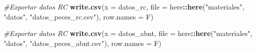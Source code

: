 \documentclass[]{krantz}
\newenvironment{Shaded}{\begin{snugshade}}{\end{snugshade}}
\newcommand{\CommentTok}[1]{\textcolor[rgb]{0.56,0.35,0.01}{\textit{#1}}}
\newcommand{\DataTypeTok}[1]{\textcolor[rgb]{0.13,0.29,0.53}{#1}}
\newcommand{\KeywordTok}[1]{\textcolor[rgb]{0.13,0.29,0.53}{\textbf{#1}}}
\newcommand{\NormalTok}[1]{#1}
\newcommand{\OperatorTok}[1]{\textcolor[rgb]{0.81,0.36,0.00}{\textbf{#1}}}
\newcommand{\StringTok}[1]{\textcolor[rgb]{0.31,0.60,0.02}{#1}}
\begin{document}
\begin{Shaded}
\end{Shaded}

\begin{Shaded}
\begin{Highlighting}[]
\CommentTok{#Exportar datos RC}
\KeywordTok{write.csv}\NormalTok{(}\DataTypeTok{x =}\NormalTok{ datos_rc,}
          \DataTypeTok{file =}\NormalTok{ here}\OperatorTok{::}\KeywordTok{here}\NormalTok{(}\StringTok{"materiales"}\NormalTok{, }\StringTok{"datos"}\NormalTok{, }\StringTok{"datos_peces_rc.csv"}\NormalTok{),}
          \DataTypeTok{row.names =}\NormalTok{ F)}
\end{Highlighting}
\end{Shaded}

\begin{Shaded}
\begin{Highlighting}[]
\CommentTok{#Exportar datos RC}
\KeywordTok{write.csv}\NormalTok{(}\DataTypeTok{x =}\NormalTok{ datos_abnt,}
          \DataTypeTok{file =}\NormalTok{ here}\OperatorTok{::}\KeywordTok{here}\NormalTok{(}\StringTok{"materiales"}\NormalTok{, }\StringTok{"datos"}\NormalTok{, }\StringTok{"datos_peces_abnt.csv"}\NormalTok{),}
          \DataTypeTok{row.names =}\NormalTok{ F)}
\end{Highlighting}
\end{Shaded}



\backmatter
\printindex
\end{document}
